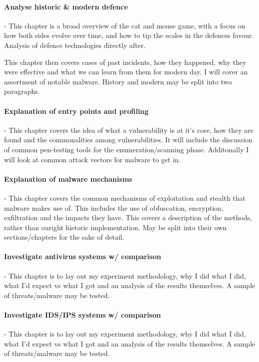 \paragraph{Analyse historic \& modern defence} - This chapter is a broad overview of the cat and mouse game, with a focus on how both sides evolve over time, 
and how to tip the scales in the defences favour. Analysis of defence technologies directly after. 

This chapter then covers cases of past incidents, how they happened, why they were effective and what we can learn from them for modern day. 
I will cover an assortment of notable malware. History and modern may be split into two paragraphs.

\paragraph{Explanation of entry points and profiling} - This chapter covers the idea of what a vulnerability is at it's core, how they are found
and the commonalities among vulnerabilities. It will include the discussion of common pen-testing tools for the enumeration/scanning phase.
Additonally I will look at common attack vectors for malware to get in.

\paragraph{Explanation of malware mechanisms} - This chapter covers the common mechanisms of exploitation and stealth that malware makes use of. 
This includes the use of obfuscation, encryption, exfiltration and the impacts they have. This covers a description of the methods, rather than ouright historic implementation.
May be split into their own sections/chapters for the sake of detail.


\paragraph{Investigate antivirus systems w/ comparison} - This chapter is to lay out my experiment methodology, why I did what I did, what I'd expect vs what I got and an analysis of the results themselves.  A sample of threats/malware may be tested.

\paragraph{Investigate IDS/IPS systems w/ comparison} - This chapter is to lay out my experiment methodology, why I did what I did, what I'd expect vs what I got and an analysis of the results themselves. A sample of threats/malware may be tested.

